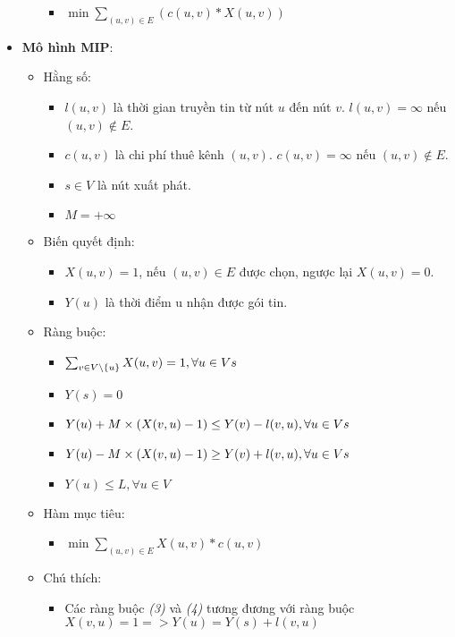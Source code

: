 \documentclass{article}
\begin{document}
\begin{itemize}
\begin{itemize}
\begin{itemize}
			\item $\min{\sum_{(u, v) \in E}^{} (c(u, v) * X(u, v))}$
		\end{itemize}
	\end{itemize}
	\item \textbf{Mô hình MIP}:
	\begin{itemize}
		\item Hằng số:
		\begin{itemize}
			\item $l(u, v)$ là thời gian truyền tin từ nút $u$ đến nút $v$. $l(u, v) = \infty$ nếu $(u, v) \not\in E$.
			\item $c(u, v)$ là chi phí thuê kênh $(u, v)$. $c(u, v) = \infty$ nếu $(u, v) \not\in E$.
			\item $s \in V$ là nút xuất phát.
			\item $M = +\infty$
		\end{itemize}
		\item Biến quyết định:
		\begin{itemize}
			\item $X(u, v) = 1$, nếu $(u, v) \in E$ được chọn, ngược lại $X(u, v) = 0$.
			\item $Y(u)$ là thời điểm u nhận được gói tin.
		\end{itemize}
		\item Ràng buộc:
		\begin{itemize}
			\item $\sum_{v \in V \setminus \{u\}}^{} X(u, v) = 1, \forall u \in V \\ {s}$
			\item $Y(s) = 0$
			\item $Y(u) + M \times (X(v, u) - 1) \leq Y(v) - l(v, u), \forall u \in V \\ {s}$
			\item $Y(u) - M \times (X(v, u) - 1) \geq Y(v) + l(v, u), \forall u \in V \\ {s}$
			\item $Y(u) \leq L, \forall u \in V$
		\end{itemize}
		\item Hàm mục tiêu:
		\begin{itemize}
			\item $\min{\sum_{(u, v) \in E}^{} X(u, v) * c(u, v)}$
		\end{itemize}
		\item Chú thích:
		\begin{itemize}
			\item Các ràng buộc \emph{(3)} và \emph{(4)} tương đương với ràng buộc $X(v, u) = 1 => Y(u) = Y(s) + l(v, u)$
		\end{itemize}
	\end{itemize}
\end{itemize}
\end{document}
